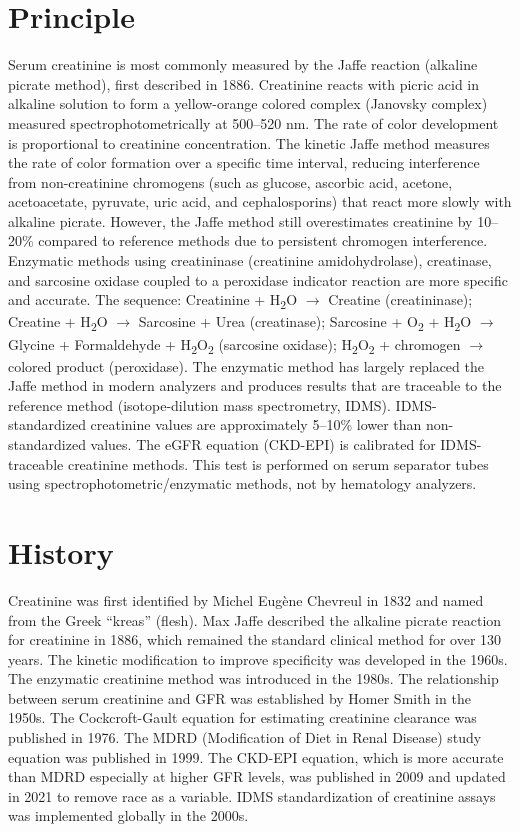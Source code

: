 \section*{Principle}
Serum creatinine is most commonly measured by the Jaffe reaction (alkaline picrate method), first described in 1886. Creatinine reacts with picric acid in alkaline solution to form a yellow-orange colored complex (Janovsky complex) measured spectrophotometrically at 500--520 nm. The rate of color development is proportional to creatinine concentration. The kinetic Jaffe method measures the rate of color formation over a specific time interval, reducing interference from non-creatinine chromogens (such as glucose, ascorbic acid, acetone, acetoacetate, pyruvate, uric acid, and cephalosporins) that react more slowly with alkaline picrate. However, the Jaffe method still overestimates creatinine by 10--20\% compared to reference methods due to persistent chromogen interference. Enzymatic methods using creatininase (creatinine amidohydrolase), creatinase, and sarcosine oxidase coupled to a peroxidase indicator reaction are more specific and accurate. The sequence: Creatinine + H\textsubscript{2}O $\rightarrow$ Creatine (creatininase); Creatine + H\textsubscript{2}O $\rightarrow$ Sarcosine + Urea (creatinase); Sarcosine + O\textsubscript{2} + H\textsubscript{2}O $\rightarrow$ Glycine + Formaldehyde + H\textsubscript{2}O\textsubscript{2} (sarcosine oxidase); H\textsubscript{2}O\textsubscript{2} + chromogen $\rightarrow$ colored product (peroxidase). The enzymatic method has largely replaced the Jaffe method in modern analyzers and produces results that are traceable to the reference method (isotope-dilution mass spectrometry, IDMS). IDMS-standardized creatinine values are approximately 5--10\% lower than non-standardized values. The eGFR equation (CKD-EPI) is calibrated for IDMS-traceable creatinine methods. This test is performed on serum separator tubes using spectrophotometric/enzymatic methods, not by hematology analyzers.

\section*{History}
Creatinine was first identified by Michel Eugène Chevreul in 1832 and named from the Greek ``kreas'' (flesh). Max Jaffe described the alkaline picrate reaction for creatinine in 1886, which remained the standard clinical method for over 130 years. The kinetic modification to improve specificity was developed in the 1960s. The enzymatic creatinine method was introduced in the 1980s. The relationship between serum creatinine and GFR was established by Homer Smith in the 1950s. The Cockcroft-Gault equation for estimating creatinine clearance was published in 1976. The MDRD (Modification of Diet in Renal Disease) study equation was published in 1999. The CKD-EPI equation, which is more accurate than MDRD especially at higher GFR levels, was published in 2009 and updated in 2021 to remove race as a variable. IDMS standardization of creatinine assays was implemented globally in the 2000s.


